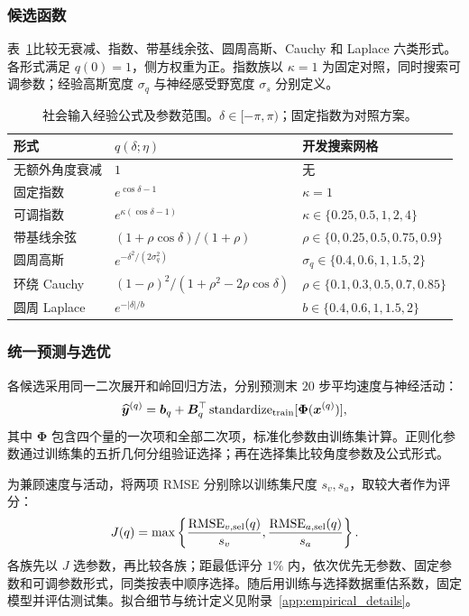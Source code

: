 \documentclass[UTF8,fontset=windows,11pt]{ctexart}
\begin{document}
\subsubsection{候选函数}
表~\ref{tab:empirical_forms}比较无衰减、指数、带基线余弦、圆周高斯、Cauchy 和 Laplace 六类形式。各形式满足 $q(0)=1$，侧方权重为正。指数族以 $\kappa=1$ 为固定对照，同时搜索可调参数；经验高斯宽度 $\sigma_q$ 与神经感受野宽度 $\sigma_s$ 分别定义。
\begin{table}[!tbp]
\centering\small
\caption{社会输入经验公式及参数范围。$\delta\in[-\pi,\pi)$；固定指数为对照方案。}
\label{tab:empirical_forms}
\begin{tabular}{lll}
\toprule
形式 & $q(\delta;\eta)$ & 开发搜索网格\\
\midrule
无额外角度衰减 & $1$ & 无\\
固定指数 & $e^{\cos\delta-1}$ & $\kappa=1$\\
可调指数 & $e^{\kappa(\cos\delta-1)}$ & $\kappa\in\{0.25,0.5,1,2,4\}$\\
带基线余弦 & $(1+\rho\cos\delta)/(1+\rho)$ & $\rho\in\{0,0.25,0.5,0.75,0.9\}$\\
圆周高斯 & $e^{-\delta^2/(2\sigma_q^2)}$ & $\sigma_q\in\{0.4,0.6,1,1.5,2\}$\\
环绕 Cauchy & $(1-\rho)^2/(1+\rho^2-2\rho\cos\delta)$ & $\rho\in\{0.1,0.3,0.5,0.7,0.85\}$\\
圆周 Laplace & $e^{-|\delta|/b}$ & $b\in\{0.4,0.6,1,1.5,2\}$\\
\bottomrule
\end{tabular}
\end{table}


\subsubsection{统一预测与选优}
各候选采用同一二次展开和岭回归方法，分别预测末 $20$ 步平均速度与神经活动：
\begin{equation}
 \widehat{\boldsymbol y}^{(q)}=\boldsymbol b_q+\boldsymbol B_q^\top
 \operatorname{standardize}_{\rm train}[\boldsymbol\Phi(\boldsymbol x^{(q)})],
 \label{eq:empirical_readout}
\end{equation}
其中 $\boldsymbol\Phi$ 包含四个量的一次项和全部二次项，标准化参数由训练集计算。正则化参数通过训练集的五折几何分组验证选择；再在选择集比较角度参数及公式形式。

为兼顾速度与活动，将两项 RMSE 分别除以训练集尺度 $s_v,s_a$，取较大者作为评分：
\begin{equation}
 J(q)=\max\left\{\frac{\operatorname{RMSE}_{v,\rm sel}(q)}{s_v},
 \frac{\operatorname{RMSE}_{a,\rm sel}(q)}{s_a}\right\}.
 \label{eq:empirical_selection_score}
\end{equation}
各族先以 $J$ 选参数，再比较各族；距最低评分 $1\%$ 内，依次优先无参数、固定参数和可调参数形式，同类按表中顺序选择。随后用训练与选择数据重估系数，固定模型并评估测试集。拟合细节与统计定义见附录~\ref{app:empirical_details}。
\end{document}
